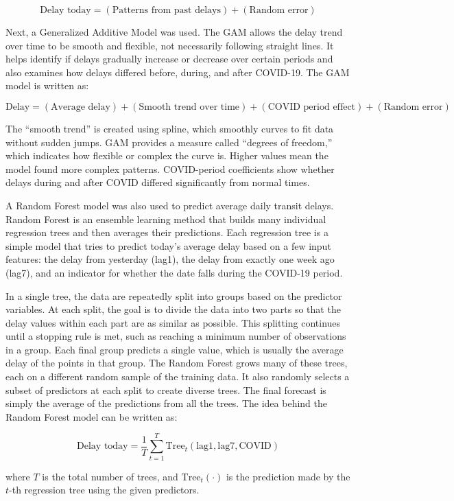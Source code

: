\documentclass[
]{article}
\begin{document}
\[
\text{Delay today} = (\text{Patterns from past delays}) + (\text{Random error})
\]

Next, a Generalized Additive Model was used. The GAM allows the delay
trend over time to be smooth and flexible, not necessarily following
straight lines. It helps identify if delays gradually increase or
decrease over certain periods and also examines how delays differed
before, during, and after COVID-19. The GAM model is written as:

\[
\text{Delay} = (\text{Average delay}) + (\text{Smooth trend over time}) + (\text{COVID period effect}) + (\text{Random error})
\]

The ``smooth trend'' is created using spline, which smoothly curves to
fit data without sudden jumps. GAM provides a measure called ``degrees
of freedom,'' which indicates how flexible or complex the curve is.
Higher values mean the model found more complex patterns. COVID-period
coefficients show whether delays during and after COVID differed
significantly from normal times.

A Random Forest model was also used to predict average daily transit
delays. Random Forest is an ensemble learning method that builds many
individual regression trees and then averages their predictions. Each
regression tree is a simple model that tries to predict today's average
delay based on a few input features: the delay from yesterday (lag1),
the delay from exactly one week ago (lag7), and an indicator for whether
the date falls during the COVID-19 period.

In a single tree, the data are repeatedly split into groups based on the
predictor variables. At each split, the goal is to divide the data into
two parts so that the delay values within each part are as similar as
possible. This splitting continues until a stopping rule is met, such as
reaching a minimum number of observations in a group. Each final group
predicts a single value, which is usually the average delay of the
points in that group. The Random Forest grows many of these trees, each
on a different random sample of the training data. It also randomly
selects a subset of predictors at each split to create diverse trees.
The final forecast is simply the average of the predictions from all the
trees. The idea behind the Random Forest model can be written as:

\[
\text{Delay today} = \frac{1}{T} \sum_{t=1}^T \text{Tree}_t(\text{lag1}, \text{lag7}, \text{COVID})
\]

where \(T\) is the total number of trees, and \(\text{Tree}_t(\cdot)\)
is the prediction made by the \(t\)-th regression tree using the given
predictors.
\end{document}
